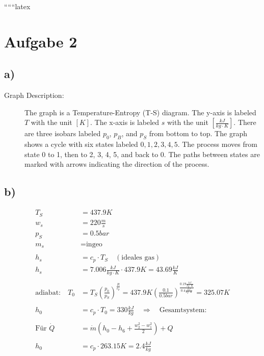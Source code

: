 
``````latex


\section*{Aufgabe 2}

\subsection*{a)}

\begin{description}
    \item[Graph Description:] The graph is a Temperature-Entropy (T-S) diagram. The y-axis is labeled \( T \) with the unit \( [K] \). The x-axis is labeled \( s \) with the unit \( \left[ \frac{kJ}{kg \cdot K} \right] \). There are three isobars labeled \( p_0 \), \( p_B \), and \( p_S \) from bottom to top. The graph shows a cycle with six states labeled \( 0, 1, 2, 3, 4, 5 \). The process moves from state 0 to 1, then to 2, 3, 4, 5, and back to 0. The paths between states are marked with arrows indicating the direction of the process.
\end{description}

\subsection*{b)}

\begin{align*}
    T_S &= 437.9 K \\
    w_s &= 220 \frac{m}{s} \\
    p_S &= 0.5 bar \\
    m_s &= \text{ingeo} \\
    \\
    h_s &= c_p \cdot T_S \quad (\text{ideales gas}) \\
    h_s &= 7.006 \frac{kJ}{kg \cdot K} \cdot 437.9 K = 43.69 \frac{kJ}{K} \\
    \\
    \text{adiabat:} \quad T_0 &= T_S \left( \frac{p_0}{p_S} \right)^{\frac{R}{c_p}} = 437.9 K \left( \frac{0.1}{0.5 bar} \right)^{\frac{0.19 \frac{kJ}{kg \cdot K}}{0.4 \frac{kJ}{kg \cdot K}}} = 325.07 K \\
    \\
    h_0 &= c_p \cdot T_0 = 330 \frac{kJ}{kg} \quad \Rightarrow \quad \text{Gesamtsystem:} \\
    \\
    \text{Für } \dot{Q} &= \dot{m} \left( h_0 - h_6 + \frac{w_2^2 - w_1^2}{2} \right) + Q \\
    \\
    h_0 &= c_p \cdot 263.15 K = 2.4 \frac{kJ}{kg}
\end{align*}

